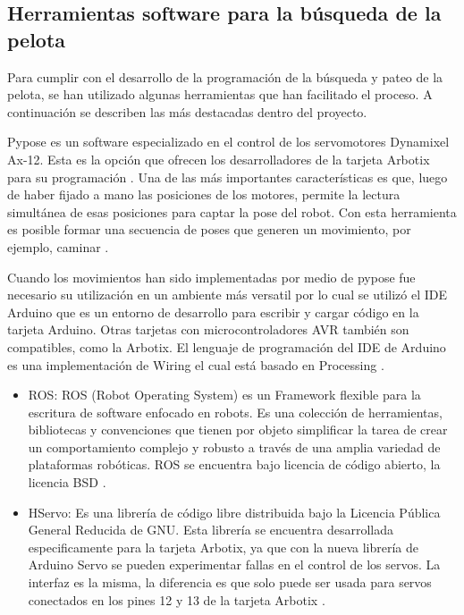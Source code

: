 \subsection{Herramientas software para la b\'usqueda de la pelota } \label{subsection:Herrbusqueda}

Para cumplir con el desarrollo de la programación de la búsqueda y pateo de la pelota, se han utilizado algunas herramientas que han facilitado el proceso. A continuación se describen las más destacadas dentro del proyecto. 

Pypose es un software especializado en el control de los servomotores Dynamixel Ax-12. Esta es la opci\'on que ofrecen los desarrolladores de la tarjeta Arbotix para su programaci\'on . Una de las más importantes características es que, luego de haber fijado a mano las posiciones de los motores, permite la lectura simultánea de esas posiciones para captar la pose del robot. Con esta herramienta es posible formar una secuencia de poses que generen un movimiento, por ejemplo, caminar \cite{pypose}. 

Cuando los movimientos han sido implementadas por medio de pypose fue necesario su utilizaci\'on en un ambiente m\'as versatil por lo cual se utiliz\'o el IDE Arduino que es un entorno de desarrollo para escribir y cargar código en la tarjeta Arduino. Otras tarjetas con microcontroladores AVR también son compatibles, como la Arbotix. El lenguaje de programación del IDE de Arduino es una implementación de Wiring el cual está basado en Processing \cite{arduino}.  

\begin{itemize}

\item ROS: ROS (Robot Operating System) es un Framework flexible para la escritura de software enfocado en robots. Es una colección de herramientas, bibliotecas y convenciones que tienen por objeto simplificar la tarea de crear un comportamiento complejo y robusto a través de una amplia variedad de plataformas robóticas. ROS se encuentra bajo licencia de código abierto, la licencia BSD \cite{ros}.

\item HServo: Es una librería de código libre distribuida bajo la Licencia Pública General Reducida de GNU. Esta librería se encuentra desarrollada especificamente para la tarjeta Arbotix, ya que con la nueva librería de Arduino Servo se pueden experimentar fallas en el control de los servos. La interfaz es la misma, la diferencia es que solo puede ser usada para servos conectados en los pines 12 y 13 de la tarjeta Arbotix \cite{HServo}.    

\end{itemize}

